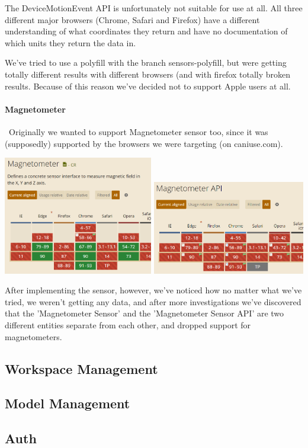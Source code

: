 The DeviceMotionEvent API is unfortunately not suitable for use at all. All three different major browsers (Chrome, Safari and Firefox) have a different understanding of what coordinates they return and have no documentation of which units they return the data in.

We've tried to use a polyfill with the branch sensors-polyfill, but were getting totally different results with different browsers (and with firefox totally broken results. Because of this reason we've decided not to support Apple users at all.

\paragraph{Magnetometer} \
Originally we wanted to support Magnetometer sensor too, since it was (supposedly) supported by the browsers we were targeting (on caniuse.com).
\begin{center}
    \includegraphics[width=0.49\textwidth]{images/magneto1.png}
    \includegraphics[width=0.5\textwidth]{images/magneto2.png}
\end{center}

After implementing the sensor, however, we've noticed how no matter what we've tried, we weren't getting any data, and after more investigations we've discovered that the 'Magnetometer Sensor' and the 'Magnetometer Sensor API' are two different entities separate from each other, and dropped support for magnetometers.

\subsection{Workspace Management}
\subsection{Model Management}
\subsection{Auth}
